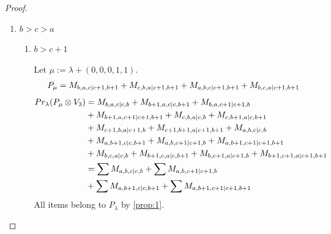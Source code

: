 \begin{proof}
\begin{enumerate}
  \item $b>c>a$
  \begin{enumerate}
    \item $b>c+1$ \par
        Let $\mu:=\lambda + (0,0,0,1,1) $.
        \begin{equation}\notag
          \begin{aligned}
            P_\mu = M_{b,a,c|c+1,b+1}
+ M_{c,b,a|c+1,b+1}
+ M_{a,b,c|c+1,b+1}
+ M_{b,c,a|c+1,b+1}
          \end{aligned}
        \end{equation}
        \begin{equation}\notag
          \begin{aligned}
            Pr_{\lambda}(P_\mu \otimes V_{3}) &=
M_{b,a,c|c,b}
+ M_{b+1,a,c|c,b+1}
+ M_{b,a,c+1|c+1,b}\\
                                              &
+ M_{b+1,a,c+1|c+1,b+1}
+ M_{c,b,a|c,b}
+ M_{c,b+1,a|c,b+1}\\
                                              &
+ M_{c+1,b,a|c+1,b}
+ M_{c+1,b+1,a|c+1,b+1}
+ M_{a,b,c|c,b}\\
                                              &
+ M_{a,b+1,c|c,b+1}
+ M_{a,b,c+1|c+1,b}
+ M_{a,b+1,c+1|c+1,b+1}\\
                                              &
+ M_{b,c,a|c,b}
+ M_{b+1,c,a|c,b+1}
+ M_{b,c+1,a|c+1,b}
+ M_{b+1,c+1,a|c+1,b+1} \\
                                               &=
\sum M_{a,b,c|c,b}
+ \sum M_{a,b,c+1|c+1,b}\\
                                              &
+ \sum M_{a,b+1,c|c,b+1}
+ \sum M_{a,b+1,c+1|c+1,b+1}
          \end{aligned}
        \end{equation}
All items belong to $P_\lambda$ by \cref{prop:1}.


\end{enumerate}
\end{enumerate}
\end{proof}
